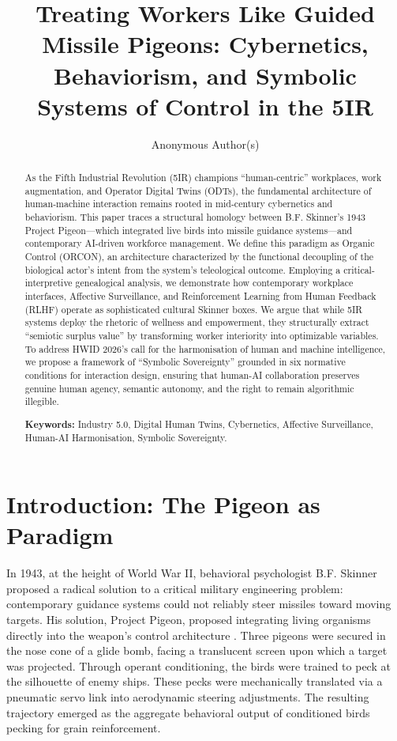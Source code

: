 \documentclass[11pt, a4paper]{article}
\title{Treating Workers Like Guided Missile Pigeons: Cybernetics, Behaviorism, and Symbolic Systems of Control in the 5IR}
\author{Anonymous Author(s)}
\affil{Submission for HWID 2026}
\date{}
\begin{document}
\maketitle

\begin{abstract}
As the Fifth Industrial Revolution (5IR) champions ``human-centric'' workplaces, work augmentation, and Operator Digital Twins (ODTs), the fundamental architecture of human-machine interaction remains rooted in mid-century cybernetics and behaviorism. This paper traces a structural homology between B.F. Skinner's 1943 Project Pigeon---which integrated live birds into missile guidance systems---and contemporary AI-driven workforce management. We define this paradigm as Organic Control (ORCON), an architecture characterized by the functional decoupling of the biological actor's intent from the system's teleological outcome. Employing a critical-interpretive genealogical analysis, we demonstrate how contemporary workplace interfaces, Affective Surveillance, and Reinforcement Learning from Human Feedback (RLHF) operate as sophisticated cultural Skinner boxes. We argue that while 5IR systems deploy the rhetoric of wellness and empowerment, they structurally extract ``semiotic surplus value'' by transforming worker interiority into optimizable variables. To address HWID 2026's call for the harmonisation of human and machine intelligence, we propose a framework of ``Symbolic Sovereignty'' grounded in six normative conditions for interaction design, ensuring that human-AI collaboration preserves genuine human agency, semantic autonomy, and the right to remain algorithmic illegible.

\textbf{Keywords:} Industry 5.0, Digital Human Twins, Cybernetics, Affective Surveillance, Human-AI Harmonisation, Symbolic Sovereignty.
\end{abstract}

\section{Introduction: The Pigeon as Paradigm}

In 1943, at the height of World War II, behavioral psychologist B.F. Skinner proposed a radical solution to a critical military engineering problem: contemporary guidance systems could not reliably steer missiles toward moving targets. His solution, Project Pigeon, proposed integrating living organisms directly into the weapon's control architecture \cite{skinner1960}. Three pigeons were secured in the nose cone of a glide bomb, facing a translucent screen upon which a target was projected. Through operant conditioning, the birds were trained to peck at the silhouette of enemy ships. These pecks were mechanically translated via a pneumatic servo link into aerodynamic steering adjustments. The resulting trajectory emerged as the aggregate behavioral output of conditioned birds pecking for grain reinforcement.
\end{document}
